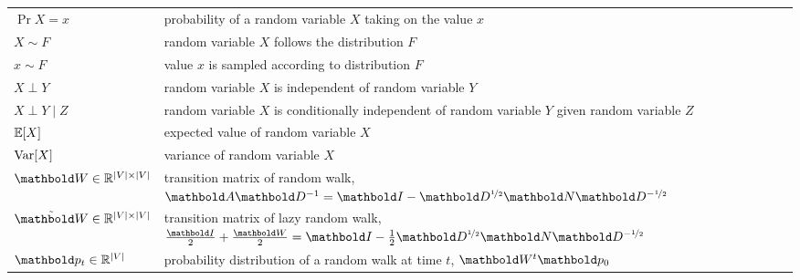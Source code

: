 \begin{fullwidth}
\vspace{0.5cm}\section*{}\vspace{-0.5cm}
\begin{longtable}{p{2.5cm}l}
   $\Pr{X = x}$ & probability of a random variable $X$ taking on the value $x$ \\
   $X \sim F$ & random variable $X$ follows the distribution $F$ \\
   $x \sim F$ & value $x$ is sampled according to distribution $F$ \\
  $X \perp Y$ & random variable $X$ is independent of random variable $Y$ \\
  $X \perp Y \mid Z$ & \makecell[tl]{random variable $X$ is conditionally independent of random variable $Y$ \\ given random variable $Z$} \\
   $\E{X}$ & expected value of random variable $X$ \\
  $\Var{X}$ & variance of random variable $X$ \\
    \addlinespace
   $\mW \in \R^{|\sV|\times|\sV|}$ & transition matrix of random walk, $\mA\inv{\mD} = \mI - \mD^{\nicefrac{1}{2}}\mN\mD^{-\nicefrac{1}{2}}$ \\
   $\Tilde{\mW} \in \R^{|\sV|\times|\sV|}$ & transition matrix of lazy random walk, $\frac{\mI}{2} + \frac{\mW}{2} = \mI - \frac{1}{2}\mD^{\nicefrac{1}{2}}\mN\mD^{-\nicefrac{1}{2}}$ \\
   $\vp_t \in \R^{|\sV|}$ & probability distribution of a random walk at time $t$, $\mW^t\vp_0$ \\
\end{longtable}


\end{fullwidth}
